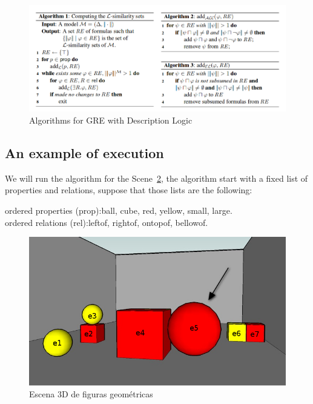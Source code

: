 \begin{figure}[h!]
\begin{center}
\includegraphics[width=\textwidth]{images/algoritmoOriginal.png}
\end{center}
\vspace*{-2em}
\caption{Algorithms for GRE with Description Logic}
\label{algoritmoOriginal}
\end{figure}

\subsection{An example of execution}

We will run the algorithm for the Scene~\ref{figure22}, the algorithm
start with a fixed list of properties and relations, suppose that
those lists are the following:

ordered properties (prop):\textsf{ball}, \textsf{cube}, \textsf{red}, \textsf{yellow}, \textsf{small}, \textsf{large}.\\
ordered relations (rel):\textsf{leftof}, \textsf{rightof}, \textsf{ontopof}, \textsf{bellowof}.

\begin{figure}
\begin{center}	
\includegraphics[width=.5\textwidth]{images/22.jpg}
\end{center}
\vspace*{-1.5em}
\caption{Escena 3D de figuras geom\'etricas}\label{figure22}
\end{figure}

